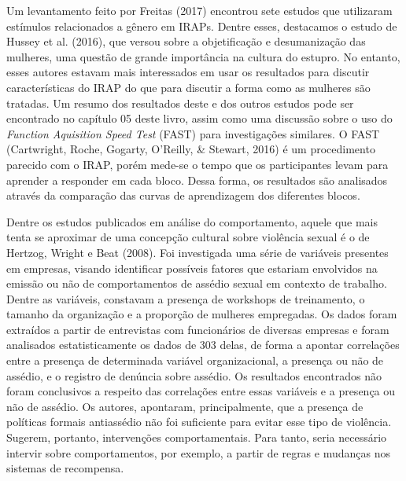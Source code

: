 Um levantamento feito por Freitas (2017) encontrou sete estudos que utilizaram estímulos relacionados a gênero em IRAPs. Dentre esses, destacamos o estudo de Hussey et al. (2016), que versou sobre a objetificação e desumanização das mulheres, uma questão de grande importância na cultura do estupro. No entanto, esses autores estavam mais interessados em usar os resultados para discutir características do IRAP do que para discutir a forma como as mulheres são tratadas. Um resumo dos resultados deste e dos outros estudos pode ser encontrado no capítulo 05 deste livro, assim como uma discussão sobre o uso do \textit{Function Aquisition Speed Test} (FAST) para investigações similares. O FAST (Cartwright, Roche, Gogarty, O'Reilly, \& Stewart, 2016) é um procedimento parecido com o IRAP, porém mede-se o tempo que os participantes levam para aprender a responder em cada bloco. Dessa forma, os resultados são analisados através da comparação das curvas de aprendizagem dos diferentes blocos.

Dentre os estudos publicados em análise do comportamento, aquele que mais tenta se aproximar de uma concepção cultural sobre violência sexual é o de Hertzog, Wright e Beat (2008). Foi investigada uma série de variáveis presentes em empresas, visando identificar possíveis fatores que estariam envolvidos na emissão ou não de comportamentos de assédio sexual em contexto de trabalho. Dentre as variáveis, constavam a presença de workshops de treinamento, o tamanho da organização e a proporção de mulheres empregadas. Os dados foram extraídos a partir de entrevistas com funcionários de diversas empresas e foram analisados estatisticamente os dados de 303 delas, de forma a apontar correlações entre a presença de determinada variável organizacional, a presença ou não de assédio, e o registro de denúncia sobre assédio. Os resultados encontrados não foram conclusivos a respeito das correlações entre essas variáveis e a presença ou não de assédio. Os autores, apontaram, principalmente, que a presença de políticas formais antiassédio não foi suficiente para evitar esse tipo de violência. Sugerem, portanto, intervenções comportamentais. Para tanto, seria necessário intervir sobre comportamentos, por exemplo, a partir de regras e mudanças nos sistemas de recompensa.

